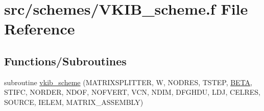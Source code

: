 \hypertarget{_v_k_i_b__scheme_8f}{\section{src/schemes/\-V\-K\-I\-B\-\_\-scheme.f File Reference}
\label{_v_k_i_b__scheme_8f}
}
\subsection*{Functions/\-Subroutines}
\begin{DoxyCompactItemize}
\item 
subroutine \hyperlink{_v_k_i_b__scheme_8f_af6de373da718098cf18a17c7744ceda0}{vkib\-\_\-scheme} (M\-A\-T\-R\-I\-X\-S\-P\-L\-I\-T\-T\-E\-R, W, N\-O\-D\-R\-E\-S, T\-S\-T\-E\-P, \hyperlink{blk_euler_i_i_8com_a41ef0ad0ee32dac89987c7180349fc65}{B\-E\-T\-A}, S\-T\-I\-F\-C, N\-O\-R\-D\-E\-R, N\-D\-O\-F, N\-O\-F\-V\-E\-R\-T, V\-C\-N, N\-D\-I\-M, D\-F\-G\-H\-D\-U, L\-D\-J, C\-E\-L\-R\-E\-S, S\-O\-U\-R\-C\-E, I\-E\-L\-E\-M, M\-A\-T\-R\-I\-X\-\_\-\-A\-S\-S\-E\-M\-B\-L\-Y)
\end{DoxyCompactItemize}



